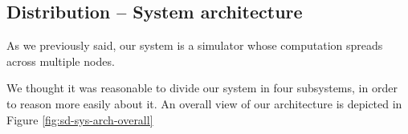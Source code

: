 \subsection{Distribution -- System architecture}
As we previously said, our system is a simulator whose computation spreads
across multiple nodes.

We thought it was reasonable to divide our system in four subsystems, in order
to reason more easily about it. An overall view of our architecture is depicted
in Figure \ref{fig:sd-sys-arch-overall}

